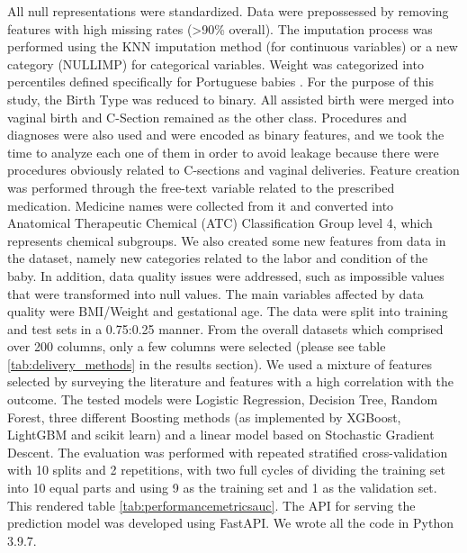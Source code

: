 All null representations were standardized. Data were prepossessed by removing features with high missing rates ({\textgreater}90\% overall). The imputation process was performed using the KNN imputation method (for continuous variables) or a new category (NULLIMP) for categorical variables. Weight was categorized into percentiles defined specifically for Portuguese babies \cite{sousa-santosDevelopmentBirthweightStandard2016}. For the purpose of this study, the Birth Type was reduced to binary. All assisted birth were merged into vaginal birth and C-Section remained as the other class. Procedures and diagnoses were also used and were encoded as binary features, and we took the time to analyze each one of them in order to avoid leakage because there were procedures obviously related to C-sections and vaginal deliveries. Feature creation was performed through the free-text variable related to the prescribed medication. Medicine names were collected from it and converted into Anatomical Therapeutic Chemical (ATC) Classification Group level 4, which represents chemical subgroups. We also created some new features from data in the dataset, namely new categories related to the labor and condition of the baby. In addition, data quality issues were addressed, such as impossible values that were transformed into null values. The main variables affected by data quality were BMI/Weight and gestational age. The data were split into training and test sets in a 0.75:0.25 manner. From the overall datasets which comprised over 200 columns, only a few columns were selected (please see table \ref{tab:delivery_methods} in the results section). We used a mixture of features selected by surveying the literature \cite{irwindaMaternalFetalCharacteristics2021,deramonfernandezPredictionModeDelivery2022,parveenAnalysisCesareanSections2021} and features with a high correlation with the outcome. The tested models were Logistic Regression, Decision Tree, Random Forest, three different Boosting methods (as implemented by XGBoost, LightGBM and scikit learn) and a linear model based on Stochastic Gradient Descent. The evaluation was performed with repeated stratified cross-validation with 10 splits and 2 repetitions, with two full cycles of dividing the training set into 10 equal parts and using 9 as the training set and 1 as the validation set. This rendered table \ref{tab:performancemetricsauc}. The API for serving the prediction model was developed using FastAPI. We wrote all the code in Python 3.9.7.


